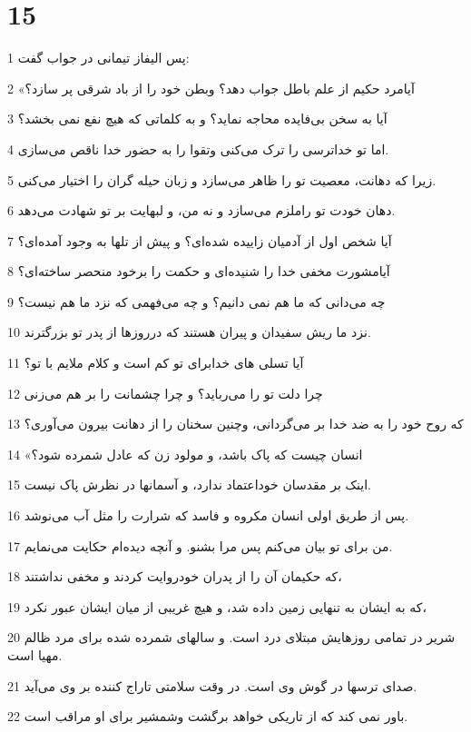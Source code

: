 \chapter{15}

\par 1 پس الیفاز تیمانی در جواب گفت:
\par 2 «آیامرد حکیم از علم باطل جواب دهد؟ وبطن خود را از باد شرقی پر سازد؟
\par 3 آیا به سخن بی‌فایده محاجه نماید؟ و به کلماتی که هیچ نفع نمی بخشد؟
\par 4 اما تو خداترسی را ترک می‌کنی وتقوا را به حضور خدا ناقص می‌سازی.
\par 5 زیرا که دهانت، معصیت تو را ظاهر می‌سازد و زبان حیله گران را اختیار می‌کنی.
\par 6 دهان خودت تو راملزم می‌سازد و نه من، و لبهایت بر تو شهادت می‌دهد.
\par 7 آیا شخص اول از آدمیان زاییده شده‌ای؟ و پیش از تلها به وجود آمده‌ای؟
\par 8 آیامشورت مخفی خدا را شنیده‌ای و حکمت را برخود منحصر ساخته‌ای؟
\par 9 چه می‌دانی که ما هم نمی دانیم؟ و چه می‌فهمی که نزد ما هم نیست؟
\par 10 نزد ما ریش سفیدان و پیران هستند که درروزها از پدر تو بزرگترند.
\par 11 آیا تسلی های خدابرای تو کم است و کلام ملایم با تو؟
\par 12 چرا دلت تو را می‌رباید؟ و چرا چشمانت را بر هم می‌زنی
\par 13 که روح خود را به ضد خدا بر می‌گردانی، وچنین سخنان را از دهانت بیرون می‌آوری؟ 
\par 14 «انسان چیست که پاک باشد، و مولود زن که عادل شمرده شود؟
\par 15 اینک بر مقدسان خوداعتماد ندارد، و آسمانها در نظرش پاک نیست.
\par 16 پس از طریق اولی انسان مکروه و فاسد که شرارت را مثل آب می‌نوشد.
\par 17 من برای تو بیان می‌کنم پس مرا بشنو. و آنچه دیده‌ام حکایت می‌نمایم.
\par 18 که حکیمان آن را از پدران خودروایت کردند و مخفی نداشتند،
\par 19 که به ایشان به تنهایی زمین داده شد، و هیچ غریبی از میان ایشان عبور نکرد،
\par 20 شریر در تمامی روزهایش مبتلای درد است. و سالهای شمرده شده برای مرد ظالم مهیا است.
\par 21 صدای ترسها در گوش وی است. در وقت سلامتی تاراج کننده بر وی می‌آید.
\par 22 باور نمی کند که از تاریکی خواهد برگشت وشمشیر برای او مراقب است.
